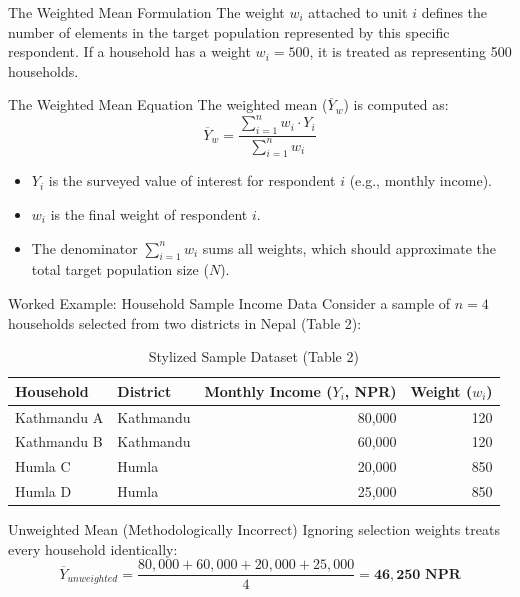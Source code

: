 \documentclass[10pt, aspectratio=169]{beamer}
\begin{document}
\begin{frame}{The Weighted Mean Formulation}
  The weight $w_i$ attached to unit $i$ defines the number of elements in the target population represented by this specific respondent. If a household has a weight $w_i = 500$, it is treated as representing 500 households.
  
  \begin{block}{The Weighted Mean Equation}
    The weighted mean ($\overline{Y}_{w}$) is computed as:
    \begin{equation}
      \overline{Y}_{w} = \frac{\sum_{i=1}^{n} w_{i} \cdot Y_{i}}{\sum_{i=1}^{n} w_{i}}
    \end{equation}
    \begin{itemize}
      \item $Y_{i}$ is the surveyed value of interest for respondent $i$ (e.g., monthly income).
      \item $w_{i}$ is the final weight of respondent $i$.
      \item The denominator $\sum_{i=1}^{n} w_{i}$ sums all weights, which should approximate the total target population size ($N$).
    \end{itemize}
  \end{block}
\end{frame}

\begin{frame}{Worked Example: Household Sample Income Data}
  Consider a sample of $n=4$ households selected from two districts in Nepal (Table 2):
  
  \begin{table}
    \centering
    \small
    \begin{tabular}{llrr}
      \toprule
      \textbf{Household} & \textbf{District} & \textbf{Monthly Income ($Y_i$, NPR)} & \textbf{Weight ($w_i$)} \\
      \midrule
      Kathmandu A & Kathmandu & 80,000 & 120 \\
      Kathmandu B & Kathmandu & 60,000 & 120 \\
      Humla C & Humla & 20,000 & 850 \\
      Humla D & Humla & 25,000 & 850 \\
      \bottomrule
    \end{tabular}
    \caption{Stylized Sample Dataset (Table 2)}
  \end{table}

  \begin{block}{Unweighted Mean (Methodologically Incorrect)}
    Ignoring selection weights treats every household identically:
    \begin{equation*}
      \overline{Y}_{unweighted} = \frac{80,000 + 60,000 + 20,000 + 25,000}{4} = \mathbf{46,250\text{ NPR}}
    \end{equation*}
  \end{block}
\end{frame}
\end{document}
